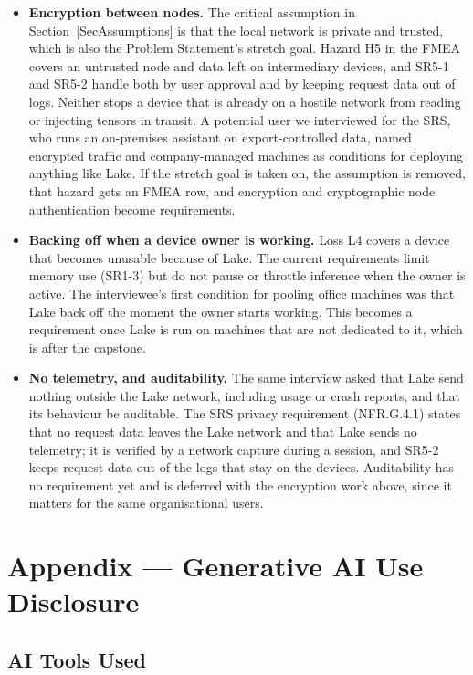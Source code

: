 \documentclass{article}
\begin{document}
\begin{itemize}
  \item \textbf{Encryption between nodes.} The critical assumption in
    Section~\ref{SecAssumptions} is that the local network is private and
    trusted, which is also the Problem Statement's stretch goal. Hazard H5
    in the FMEA covers an untrusted node and data left on intermediary
    devices, and SR5-1 and SR5-2 handle both by user approval and by
    keeping request data out of logs. Neither stops a device that is
    already on a hostile network from reading or injecting tensors in
    transit. A potential user we interviewed for the SRS, who runs an
    on-premises assistant on export-controlled data, named encrypted
    traffic and company-managed machines as conditions for deploying
    anything like Lake. If the stretch goal is taken on, the assumption is
    removed, that hazard gets an FMEA row, and encryption and
    cryptographic node authentication become requirements.
  \item \textbf{Backing off when a device owner is working.} Loss L4 covers
    a device that becomes unusable because of Lake. The current
    requirements limit memory use (SR1-3) but do not pause or throttle
    inference when the owner is active. The interviewee's first condition
    for pooling office machines was that Lake back off the moment the
    owner starts working. This becomes a requirement once Lake is run on
    machines that are not dedicated to it, which is after the capstone.
  \item \textbf{No telemetry, and auditability.} The same interview asked
    that Lake send nothing outside the Lake network, including usage or crash
    reports, and that its behaviour be auditable. The SRS privacy
    requirement (NFR.G.4.1) states that no request data leaves the Lake network
    and that Lake sends no telemetry; it is verified by a network capture
    during a session, and SR5-2 keeps request data out of the logs that
    stay on the devices. Auditability has no requirement yet and is
    deferred with the encryption work above, since it matters for the same
    organisational users.
\end{itemize}

\newpage{}

\section{Appendix --- Generative AI Use Disclosure}

\subsection{AI Tools Used}
\end{document}
